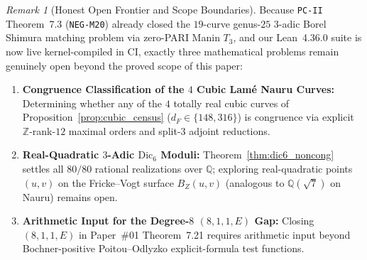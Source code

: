 \documentclass[11pt]{amsart}
\numberwithin{equation}{section}
\theoremstyle{plain}
\theoremstyle{definition}\newtheorem{definition}[theorem]{Definition}
\theoremstyle{remark}\newtheorem{remark}[theorem]{Remark}
\newcommand{\Q}{\mathbb{Q}}
\newcommand{\Z}{\mathbb{Z}}
\newcommand{\Dic}{\mathrm{Dic}}
\begin{document}
\begin{remark}[Honest Open Frontier and Scope Boundaries]\label{rem:open_frontier}
Because \texttt{PC-II} Theorem~7.3 (\texttt{NEG-M20}) already closed the $19$-curve genus-$25$ $3$-adic Borel Shimura matching problem via zero-PARI Manin $T_3$, and our Lean~4.36.0 suite is now live kernel-compiled in CI, exactly three mathematical problems remain genuinely open beyond the proved scope of this paper:
\begin{enumerate}[label=(\arabic*),nosep]
\item \textbf{Congruence Classification of the $4$ Cubic Lam\'e Nauru Curves:} Determining whether any of the $4$ totally real cubic curves of Proposition~\ref{prop:cubic_census} ($d_F\in\{148, 316\}$) is congruence via explicit $\Z$-rank-$12$ maximal orders and split-$3$ adjoint reductions.
\item \textbf{Real-Quadratic $3$-Adic $\Dic_6$ Moduli:} Theorem~\ref{thm:dic6_noncong} settles all $80/80$ rational realizations over $\Q$; exploring real-quadratic points $(u,v)$ on the Fricke--Vogt surface $B_Z(u,v)$ (analogous to $\Q(\sqrt{7})$ on Nauru) remains open.
\item \textbf{Arithmetic Input for the Degree-$8$ $(8,1,1,E)$ Gap:} Closing $(8,1,1,E)$ in Paper~\#01 Theorem~7.21 requires arithmetic input beyond Bochner-positive Poitou--Odlyzko explicit-formula test functions.
\end{enumerate}
\end{remark}



\end{document}
